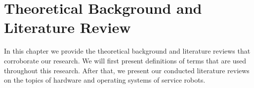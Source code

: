 \documentclass[12pt]{scrreprt}
\begin{document}
\chapter{Theoretical Background and Literature Review}
In this chapter we provide the theoretical background and literature reviews that corroborate our research. We will first present definitions of terms that are used throughout this research. After that, we present our conducted literature reviews on the topics of hardware and operating systems of service robots.
\label{Theoretical Background}

\end{document}

